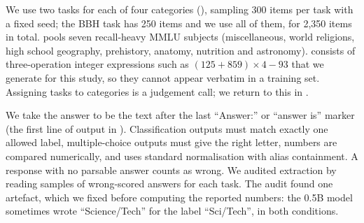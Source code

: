 We use two tasks for each of four categories (), sampling 300 items per task with a fixed seed; the BBH task has 250 items and we use all of them, for 2,350 items in total.
\mmlu pools seven recall-heavy MMLU subjects (miscellaneous, world religions, high school geography, prehistory, anatomy, nutrition and astronomy).
\synth consists of three-operation integer expressions such as $(125 + 859) \times 4 - 93$ that we generate for this study, so they cannot appear verbatim in a training set.
Assigning tasks to categories is a judgement call; we return to this in .

\begin{table}[t]
    \centering
    \caption{Tasks. Chance is the accuracy of uniform guessing.}
    \label{tab:tasks}
    \small
\end{table}

We take the answer to be the text after the last ``Answer:'' or ``answer is'' marker (the first line of output in \direct).
Classification outputs must match exactly one allowed label, multiple-choice outputs must give the right letter, numbers are compared numerically, and \triviaqa uses standard normalisation with alias containment.
A \CoT response with no parsable answer counts as wrong.
We audited extraction by reading samples of wrong-scored \CoT answers for each task.
The audit found one artefact, which we fixed before computing the reported numbers: the 0.5B model sometimes wrote ``Science/Tech'' for the label ``Sci/Tech'', in both conditions.

